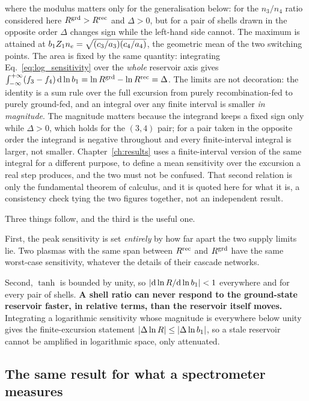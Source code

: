 \noindent where the modulus matters only for the generalisation below: for the
$n_3/n_4$ ratio considered here $R^{\rm grd} > R^{\rm rec}$ and
$\Delta > 0$, but for a pair of shells drawn in the opposite order $\Delta$
changes sign while the left-hand side cannot. The maximum is attained at
$b_1Z_{1}n_e = \sqrt{(c_3/a_3)(c_4/a_4)}$, the
geometric mean of the two switching points. The area is fixed by the same
quantity: integrating Eq.~\eqref{eq:log_sensitivity} over the \emph{whole}
reservoir axis gives
$\int_{-\infty}^{+\infty}(f_{3}-f_{4})\,\mathrm{d}\ln b_1 =
\ln R^{\rm grd} - \ln R^{\rm rec} = \Delta$. The limits are not
decoration: the identity is a sum rule over the full excursion from
purely recombination-fed to purely ground-fed, and an integral over any finite
interval is smaller \emph{in magnitude}. The magnitude matters because the
integrand keeps a fixed sign only while $\Delta > 0$, which holds for the
$(3,4)$ pair; for a pair taken in the opposite order the integrand is negative
throughout and every finite-interval integral is larger, not smaller. Chapter~\ref{ch:results} uses a finite-interval version of
the same integral for a different purpose, to define a mean sensitivity over the
excursion a real step produces, and the two must not be confused. That second relation is only the fundamental
theorem of calculus, and it is quoted here for what it is, a consistency check
tying the two figures together, not an independent result.

Three things follow, and the third is the useful one.

First, the peak sensitivity is set \emph{entirely} by how far apart the two
supply limits lie. Two plasmas with the same span between $R^{\rm rec}$ and
$R^{\rm grd}$ have the same worst-case sensitivity, whatever the details of
their cascade networks.

Second, $\tanh$ is bounded by unity, so
$|\mathrm{d}\ln R/\mathrm{d}\ln b_1| < 1$ everywhere and for every pair of
shells. \textbf{A shell ratio can never respond to the ground-state reservoir
faster, in relative terms, than the reservoir itself moves.} Integrating a
logarithmic sensitivity whose magnitude is everywhere below unity gives the
finite-excursion statement $|\Delta\ln R| \le |\Delta\ln b_1|$, so a stale
reservoir cannot be amplified in logarithmic space, only attenuated.

\subsection{The same result for what a spectrometer measures}
\label{sec:emissivity_generalisation}

